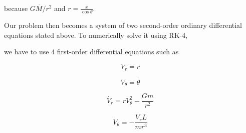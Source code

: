 \documentclass{article}
\begin{document}
because $\ddot{GM/r^2}$ and $r = \frac{x}{\cos{\theta}}$.

Our problem then becomes a system of two second-order ordinary differential equations stated above.
To numerically solve it using RK-4,

we have to use 4 first-order differential equations such as 

\begin{equation}
    V_r = \dot{r}
\end{equation}

\begin{equation}
    V_\theta = \dot{\theta}
\end{equation}

\begin{equation}
    \dot{V_r} = r V_\theta ^2 - \frac{Gm}{r^2}
\end{equation}

\begin{equation}
    \dot{V_\theta} = - \frac{V_r L}{mr^3} 
\end{equation}
\end{document}
